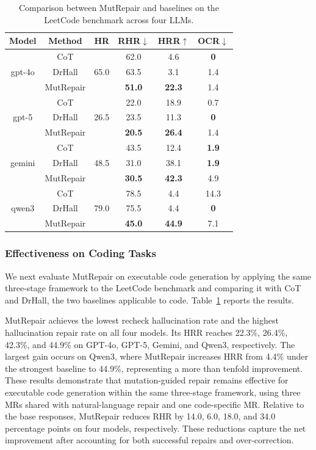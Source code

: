 \documentclass[acmsmall,screen,review,anonymous]{acmart}
\begin{document}
\begin{table}[!htbp]
  \centering
  \footnotesize
  \setlength{\tabcolsep}{8pt}
  \caption{Comparison between MutRepair and baselines on the LeetCode benchmark across four LLMs.}
    \begin{tabular}{c|c|cccc}
    \toprule
    Model & Method & HR & RHR$\downarrow$ & HRR$\uparrow$ & OCR$\downarrow$ \\
    \midrule
    \midrule
    \multirow{3}{*}{gpt-4o} & CoT       & \multirow{3}{*}{65.0} & 62.0 & 4.6  & \textbf{0} \\
          & DrHall    &  & 63.5 & 3.1  & 1.4 \\
          & MutRepair & & \textbf{51.0} & \textbf{22.3} & 1.4 \\
    \midrule
    \multirow{3}{*}{gpt-5} & CoT       & \multirow{3}{*}{26.5} & 22.0 & 18.9 & 0.7 \\
          & DrHall    &  & 23.5 & 11.3 & \textbf{0} \\
          & MutRepair &  & \textbf{20.5} & \textbf{26.4} & 1.4 \\
    \midrule
    \multirow{3}{*}{gemini} & CoT       & \multirow{3}{*}{48.5} & 43.5 & 12.4 & \textbf{1.9} \\
          & DrHall    &  & 31.0 & 38.1 & \textbf{1.9} \\
          & MutRepair & & \textbf{30.5} & \textbf{42.3} & 4.9 \\
    \midrule
    \multirow{3}{*}{qwen3} & CoT       & \multirow{3}{*}{79.0} & 78.5 & 4.4 & 14.3 \\
          & DrHall    &  & 75.5 & 4.4 & \textbf{0} \\
          & MutRepair &  & \textbf{45.0} & \textbf{44.9} & 7.1 \\
    \bottomrule
    \end{tabular}
  \label{tab:rq1.2}
\end{table}

\subsubsection{Effectiveness on Coding Tasks}
We next evaluate MutRepair on executable code generation by applying the same three-stage framework to the LeetCode benchmark and comparing it with CoT and DrHall, the two baselines applicable to code. Table~\ref{tab:rq1.2} reports the results.

MutRepair achieves the lowest recheck hallucination rate and the highest hallucination repair rate on all four models. Its HRR reaches 22.3\%, 26.4\%, 42.3\%, and 44.9\% on GPT-4o, GPT-5, Gemini, and Qwen3, respectively. The largest gain occurs on Qwen3, where MutRepair increases HRR from 4.4\% under the strongest baseline to 44.9\%, representing a more than tenfold improvement. These results demonstrate that mutation-guided repair remains effective for executable code generation within the same three-stage framework, using three MRs shared with natural-language repair and one code-specific MR. Relative to the base responses, MutRepair reduces RHR by 14.0, 6.0, 18.0, and 34.0 percentage points on four models, respectively. These reductions capture the net improvement after accounting for both successful repairs and over-correction.
\end{document}
